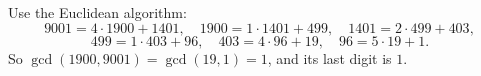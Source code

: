 Use the Euclidean algorithm:
\[9001=4\cdot1900+1401,\quad1900=1\cdot1401+499,\quad1401=2\cdot499+403,\]
\[499=1\cdot403+96,\quad403=4\cdot96+19,\quad96=5\cdot19+1.\]
So $\gcd(1900,9001)=\gcd(19,1)=1$, and its last digit is $\boxed{1}$.
